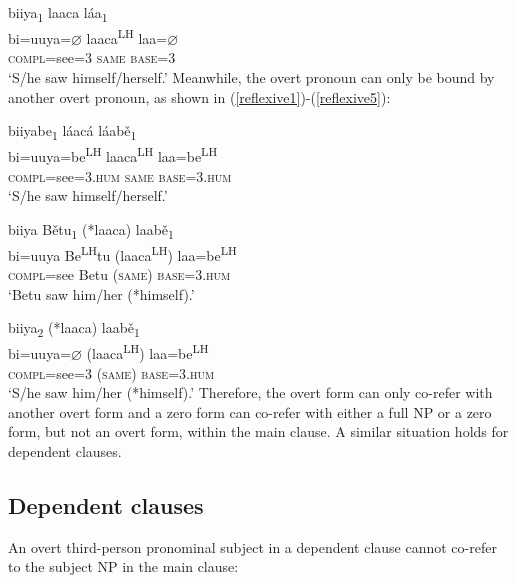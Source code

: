 \ea\label{reflexive2} 
\glll biiya\textsubscript{1} laaca l\'{a}a\textsubscript{1} \\
bi=uuya={$\varnothing$} laaca\textsuperscript{LH} laa={$\varnothing$} \\
\textsc{compl}=see=\textsc{3} \textsc{same} \textsc{base}=\textsc{3} \\
\glt `S/he saw himself/herself.'
\z
Meanwhile, the overt pronoun can only be bound by another overt pronoun, as shown in (\ref{reflexive1})-(\ref{reflexive5}):

\ea\label{reflexive1}
\glll biiyabe\textsubscript{1} l\'{a}ac\'{a} l\'{a}ab\v{e}\textsubscript{1} \\
bi=uuya=be\textsuperscript{LH}  laaca\textsuperscript{LH} laa=be\textsuperscript{LH}  \\
\textsc{compl}=see=\textsc{3.hum} \textsc{same} \textsc{base}=\textsc{3.hum} \\
\glt `S/he saw himself/herself.'
\z

\ea\label{reflexive4}
\glll biiya B\v{e}tu\textsubscript{1} (*laaca) laab\v{e}\textsubscript{1} \\
bi=uuya Be\textsuperscript{LH}tu (laaca\textsuperscript{LH}) laa=be\textsuperscript{LH}  \\
\textsc{compl}=see Betu (\textsc{same}) \textsc{base}=\textsc{3.hum} \\
\glt `Betu saw him/her (*himself).'
\z

\ea\label{reflexive5}
\glll biiya\textsubscript{2} (*laaca) laab\v{e}\textsubscript{1} \\
bi=uuya={$\varnothing$} (laaca\textsuperscript{LH}) laa=be\textsuperscript{LH}  \\
\textsc{compl}=see=\textsc{3} (\textsc{same}) \textsc{base}=\textsc{3.hum} \\
\glt `S/he saw him/her (*himself).'
\z
Therefore, the overt form can only co-refer with another overt form and a zero form can co-refer with either a full NP or a zero form, but not an overt form, within the main clause. A similar situation holds for dependent clauses.


\subsection{Dependent clauses}

An overt third-person pronominal subject in a dependent clause cannot co-refer to the subject NP in the main clause:

